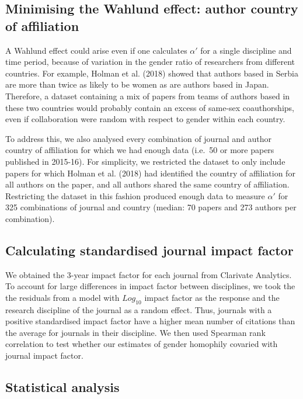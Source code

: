\documentclass[12pt,]{article}
\begin{document}
\subsection{Minimising the Wahlund effect: author country of
affiliation}\label{minimising-the-wahlund-effect-author-country-of-affiliation}

A Wahlund effect could arise even if one calculates \(\alpha'\) for a
single discipline and time period, because of variation in the gender
ratio of researchers from different countries. For example, Holman et
al. (2018) showed that authors based in Serbia are more than twice as
likely to be women as are authors based in Japan. Therefore, a dataset
containing a mix of papers from teams of authors based in these two
countries would probably contain an excess of same-sex coauthorships,
even if collaboration were random with respect to gender within each
country.

To address this, we also analysed every combination of journal and
author country of affiliation for which we had enough data (i.e.~50 or
more papers published in 2015-16). For simplicity, we restricted the
dataset to only include papers for which Holman et al. (2018) had
identified the country of affiliation for all authors on the paper, and
all authors shared the same country of affiliation. Restricting the
dataset in this fashion produced enough data to measure \(\alpha'\) for
325 combinations of journal and country (median: 70 papers and 273
authors per combination).

\subsection{Calculating standardised journal impact
factor}\label{calculating-standardised-journal-impact-factor}

We obtained the 3-year impact factor for each journal from Clarivate
Analytics. To account for large differences in impact factor between
disciplines, we took the the residuals from a model with \(Log_{10}\)
impact factor as the response and the research discipline of the journal
as a random effect. Thus, journals with a positive standardised impact
factor have a higher mean number of citations than the average for
journals in their discipline. We then used Spearman rank correlation to
test whether our estimates of gender homophily covaried with journal
impact factor.

\subsection{Statistical analysis}\label{statistical-analysis}
\end{document}
